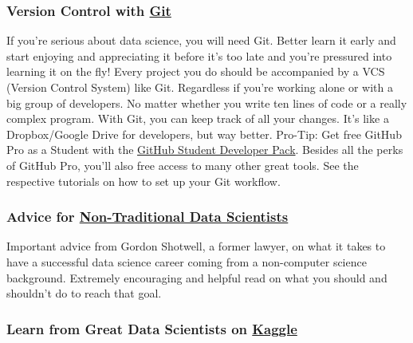 \documentclass[
  11pt,
]{article}
\begin{document}
\hypertarget{version-control-with-git}{%
\subsubsection*{\texorpdfstring{Version Control with \href{https://github.com/}{Git}}{Version Control with Git}}\label{version-control-with-git}}

If you're serious about data science, you will need Git. Better learn it early and start enjoying and appreciating it before it's too late and you're pressured into learning it on the fly! Every project you do should be accompanied by a VCS (Version Control System) like Git. Regardless if you're working alone or with a big group of developers. No matter whether you write ten lines of code or a really complex program. With Git, you can keep track of all your changes. It's like a Dropbox/Google Drive for developers, but way better. Pro-Tip: Get free GitHub Pro as a Student with the \href{https://education.github.com/pack}{GitHub Student Developer Pack}. Besides all the perks of GitHub Pro, you'll also free access to many other great tools. See the respective tutorials on how to set up your Git workflow.

\hypertarget{advice-for-non-traditional-data-scientists}{%
\subsubsection*{\texorpdfstring{Advice for \href{https://blog.shotwell.ca/posts/learning_data_science/}{Non-Traditional Data Scientists}}{Advice for Non-Traditional Data Scientists}}\label{advice-for-non-traditional-data-scientists}}

Important advice from Gordon Shotwell, a former lawyer, on what it takes to have a successful data science career coming from a non-computer science background. Extremely encouraging and helpful read on what you should and shouldn't do to reach that goal.

\hypertarget{learn-from-great-data-scientists-on-kaggle}{%
\subsubsection*{\texorpdfstring{Learn from Great Data Scientists on \href{https://www.kaggle.com/}{Kaggle}}{Learn from Great Data Scientists on Kaggle}}\label{learn-from-great-data-scientists-on-kaggle}}
\end{document}
